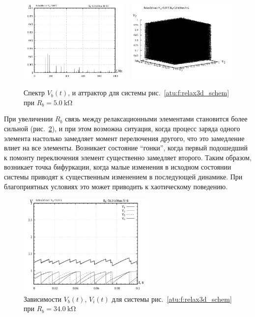 \begin{figure}[htb!]
  \centerline{
    \includegraphics[width=0.48\textwidth]{p/relax3d_f_02.png}
    ~
    \includegraphics[width=0.48\textwidth]{p/relax3d_v1v2v3_02.png}
  }
  \caption{Спектр $V_b(t)$, и аттрактор для системы рис.~\ref{atu:f:relax3d_schem} при $R_b=\SI{5.0}{\kilo\ohm}$ }
  \label{atu:f:relax3d_f_02}
\end{figure}

При увеличении $R_b$ связь между релаксационными элементами становится более сильной
(рис.~\ref{atu:f:relax3d_t_08}), и при этом возможна ситуация, когда
процесс заряда одного элемента настолько замедляет момент перелючения другого,
что это замедление влиет на все элементы. Возникает состояние ``гонки'',
когда первый подошедший к помонту переключения элемент существенно замедляет второго.
Таким образом, возникает точка бифуркации, когда малые изменения
в исходном состоянии системы приводят к существенным изменением в последующей динамике.
При благоприятных условиях это может приводить к хаотическому поведению.


\begin{figure}[htb!]
  \centerline{\includegraphics[width=0.6\textwidth]{p/relax3d_t_08.png} }
  \caption{Зависимости $V_b(t)$, $V_i(t)$ для системы рис.~\ref{atu:f:relax3d_schem} при $R_b=\SI{34.0}{\kilo\ohm}$ }
  \label{atu:f:relax3d_t_08}
\end{figure}

